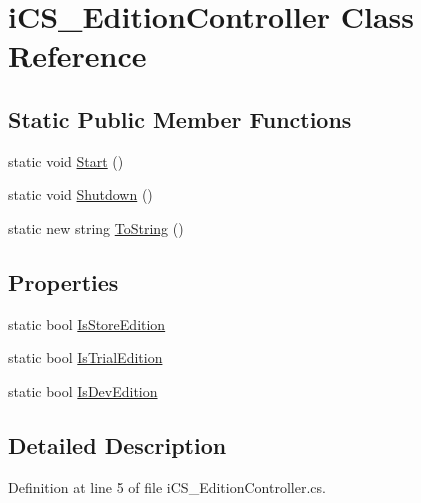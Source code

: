 \hypertarget{classi_c_s___edition_controller}{\section{i\+C\+S\+\_\+\+Edition\+Controller Class Reference}
\label{classi_c_s___edition_controller}
}
\subsection*{Static Public Member Functions}
\begin{DoxyCompactItemize}
\item 
static void \hyperlink{classi_c_s___edition_controller_aa550a4054d4204a1f7e715a319ad8c97}{Start} ()
\item 
static void \hyperlink{classi_c_s___edition_controller_a16e2d00e116b2cf0b3ba7732eeea5144}{Shutdown} ()
\item 
static new string \hyperlink{classi_c_s___edition_controller_a464dfa6950ab92f5e627de2da7a2d3e6}{To\+String} ()
\end{DoxyCompactItemize}
\subsection*{Properties}
\begin{DoxyCompactItemize}
\item 
static bool \hyperlink{classi_c_s___edition_controller_abddf73e6a8588f0dca62e882665ad44a}{Is\+Store\+Edition}
\item 
static bool \hyperlink{classi_c_s___edition_controller_a9b3d5e2d900ae63ffbe0c7c0df0e9dfc}{Is\+Trial\+Edition}
\item 
static bool \hyperlink{classi_c_s___edition_controller_ae5ce4e3bd30253922ce95997660ec219}{Is\+Dev\+Edition}
\end{DoxyCompactItemize}


\subsection{Detailed Description}


Definition at line 5 of file i\+C\+S\+\_\+\+Edition\+Controller.\+cs.



